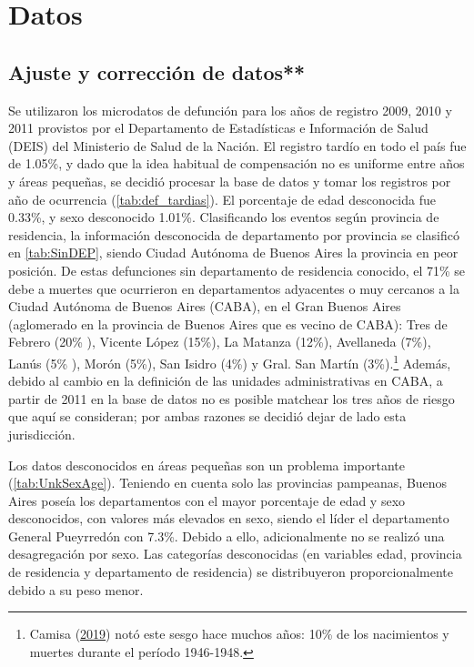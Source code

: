 \documentclass[12pt,]{article}
\begin{document}
\hypertarget{datos}{%
\section{\texorpdfstring{\textbf{Datos}}{Datos}}\label{datos}}

\hypertarget{ajuste-y-correcciuxf3n-de-datos}{%
\subsection{Ajuste y corrección de
datos**}\label{ajuste-y-correcciuxf3n-de-datos}}

Se utilizaron los microdatos de defunción para los años de registro
2009, 2010 y 2011 provistos por el Departamento de Estadísticas e
Información de Salud (DEIS) del Ministerio de Salud de la Nación. El
registro tardío en todo el país fue de 1.05\%, y dado que la idea
habitual de compensación no es uniforme entre años y áreas pequeñas, se
decidió procesar la base de datos y tomar los registros por año de
ocurrencia (\ref{tab:def_tardias}). El porcentaje de edad desconocida
fue 0.33\%, y sexo desconocido 1.01\%. Clasificando los eventos según
provincia de residencia, la información desconocida de departamento por
provincia se clasificó en \ref{tab:SinDEP}, siendo Ciudad Autónoma de
Buenos Aires la provincia en peor posición. De estas defunciones sin
departamento de residencia conocido, el 71\% se debe a muertes que
ocurrieron en departamentos adyacentes o muy cercanos a la Ciudad
Autónoma de Buenos Aires (CABA), en el Gran Buenos Aires (aglomerado en
la provincia de Buenos Aires que es vecino de CABA): Tres de Febrero
(20\% ), Vicente López (15\%), La Matanza (12\%), Avellaneda (7\%),
Lanús (5\% ), Morón (5\%), San Isidro (4\%) y Gral. San Martín
(3\%).\footnote{Camisa (\protect\hyperlink{ref-Camisa_2019}{2019}) notó
  este sesgo hace muchos años: 10\% de los nacimientos y muertes durante
  el período 1946-1948.} Además, debido al cambio en la definición de
las unidades administrativas en CABA, a partir de 2011 en la base de
datos no es posible matchear los tres años de riesgo que aquí se
consideran; por ambas razones se decidió dejar de lado esta
jurisdicción.

Los datos desconocidos en áreas pequeñas son un problema importante
(\ref{tab:UnkSexAge}). Teniendo en cuenta solo las provincias pampeanas,
Buenos Aires poseía los departamentos con el mayor porcentaje de edad y
sexo desconocidos, con valores más elevados en sexo, siendo el líder el
departamento General Pueyrredón con 7.3\%. Debido a ello, adicionalmente
no se realizó una desagregación por sexo. Las categorías desconocidas
(en variables edad, provincia de residencia y departamento de
residencia) se distribuyeron proporcionalmente debido a su peso menor.
\end{document}
